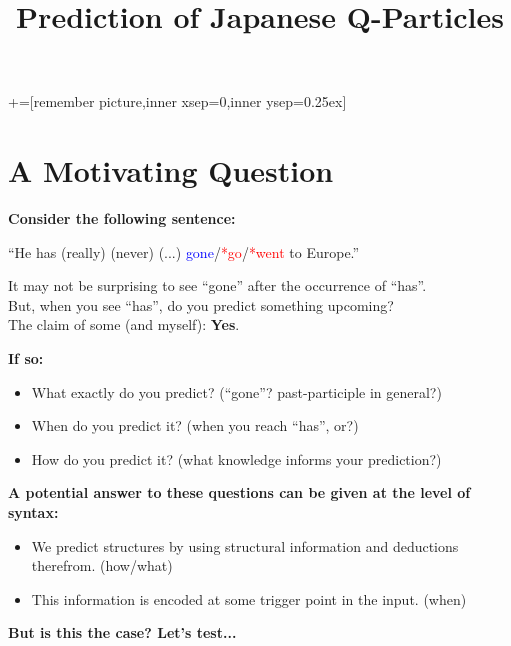 \documentclass[12pt]{article}
\title{{\normalsize\bfseries {Prediction of Japanese Q-Particles}}}
\author{\normalsize\bfseries {}}
\date{\vspace{-10ex}}
\begin{document}
\usetikzlibrary{topaths}
+=[remember picture,inner xsep=0,inner ysep=0.25ex]


\maketitle

\section{A Motivating Question}
\textbf{Consider the following sentence:}
\begin{center}
    ``He has (really) (never) (...) \textcolor{blue}{gone}/\textcolor{red}{*go}/\textcolor{red}{*went} to Europe.''
\end{center}

\begin{center}
    It may not be surprising to see ``gone'' after the occurrence of ``has''.\\
    But, when you see ``has'', do you predict something upcoming?\\
    The claim of some (and myself): \textbf{Yes}.
\end{center}


\textbf{If so:}
\begin{itemize}
    \item What exactly do you predict? (``gone''? past-participle in general?)
    \item When do you predict it? (when you reach ``has'', or?)
    \item How do you predict it? (what knowledge informs your prediction?)
\end{itemize}

\vspace{0.2cm}

\textbf{A potential answer to these questions can be given at the level of syntax:}

\begin{itemize}%
    \renewcommand{\labelitemi}{$\Rightarrow$}
    \item We predict structures by using structural information and deductions therefrom. (how/what)
    \item This information is encoded at some trigger point in the input. (when)
\end{itemize} 

\vspace{0.2cm}
\begin{center}
    \textbf{But is this the case? Let's test...}
\end{center}
\end{document}
